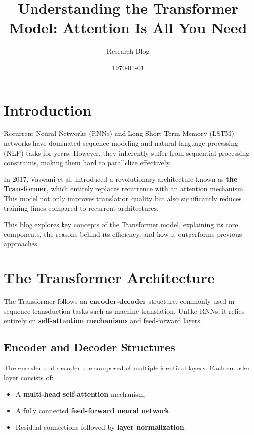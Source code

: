 \documentclass{article}
\title{Understanding the Transformer Model: Attention Is All You Need}
\author{Research Blog}
\date{\today}
\begin{document}
\maketitle

\section{Introduction}

Recurrent Neural Networks (RNNs) and Long Short-Term Memory (LSTM) networks have dominated sequence modeling and natural language processing (NLP) tasks for years. However, they inherently suffer from sequential processing constraints, making them hard to parallelize effectively. 

In 2017, Vaswani et al. introduced a revolutionary architecture known as \textbf{the Transformer}, which entirely replaces recurrence with an attention mechanism. This model not only improves translation quality but also significantly reduces training times compared to recurrent architectures. 

This blog explores key concepts of the Transformer model, explaining its core components, the reasons behind its efficiency, and how it outperforms previous approaches.

\section{The Transformer Architecture}

The Transformer follows an \textbf{encoder-decoder} structure, commonly used in sequence transduction tasks such as machine translation. Unlike RNNs, it relies entirely on \textbf{self-attention mechanisms} and feed-forward layers.

\subsection{Encoder and Decoder Structures}

The encoder and decoder are composed of multiple identical layers. Each encoder layer consists of:
\begin{itemize}
    \item A \textbf{multi-head self-attention} mechanism.
    \item A fully connected \textbf{feed-forward neural network}.
    \item Residual connections followed by \textbf{layer normalization}.
\end{itemize}
\end{document}
